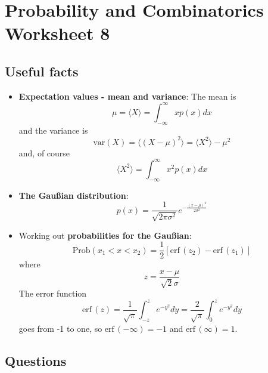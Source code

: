 \documentclass[11pt,a4paper]{scrartcl}
\begin{document}
\section*{Probability and Combinatorics Worksheet 8}

\subsection*{Useful facts}

\begin{itemize}

\item \textbf{Expectation values - mean and variance}:
The mean is
  \begin{equation}
    \mu=\langle X\rangle = \int_{-\infty}^\infty xp(x)dx
  \end{equation}
  and the variance is
  \begin{equation}
    \mbox{var}(X)=\langle (X-\mu)^2\rangle=\langle X^2\rangle-\mu^2
  \end{equation}
  and, of course
  \begin{equation}
    \langle X^2\rangle =\int_{-\infty}^\infty x^2p(x)dx
  \end{equation}
  
\item \textbf{The Gau\ss{}ian distribution}:
  \begin{equation}
    p(x)=\frac{1}{\sqrt{2\pi\sigma^2}}e^{-\frac{(x-\mu)^2}{2\sigma^2}}
  \end{equation}
  

\item Working out \textbf{probabilities for the Gau\ss{}ian}:
  \begin{equation}
\mbox{Prob}(x_1<x<x_2)=\frac{1}{2}[\mbox{erf}\,(z_2)-\mbox{erf}\,(z_1)]
  \end{equation}
where
\begin{equation}
z=\frac{x-\mu}{\sqrt{2}\sigma}
\end{equation}
The error function 
\begin{equation}
  \mbox{erf}\,(z)=\frac{1}{\sqrt{\pi}}\int_{-z}^ze^{-y^2}dy=\frac{2}{\sqrt{\pi}}\int_0^ze^{-y^2}dy
\end{equation}
goes from -1 to one, so $\mbox{erf}\,(-\infty)=-1$ and $\mbox{erf}\,(\infty)=1$.


  
\end{itemize}



\subsection*{Questions}
\end{document}
